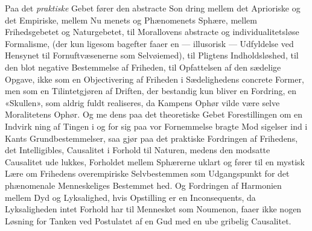\documentclass[12pt,a4paper]{book}
\begin{document}
Paa det \emph{praktiske} Gebet fører den abstracte Son\-%
dring mellem det Aprioriske og det Empiriske, mellem Nu\-%
menets og Phænomenets Sphære, mellem Frihedsgebetet og
Naturgebetet, til Morallovens abstracte og individualitetsløse
Formalisme, (der kun ligesom bagefter faaer en --- illusorisk ---
Udfyldelse ved Hensynet til Fornuftvæsenerne som Selvøiemed),
til Pligtens Indholdsløshed, til den blot negative Bestemmelse
af Friheden, til Opfattelsen af den sædelige Opgave, ikke som
en Objectivering af Friheden i Sædelighedens concrete Former,
men som en Tilintetgjøren af Driften, der bestandig kun bliver
en Fordring, en «Skullen», som aldrig fuldt realiseres, da
Kampens Ophør vilde være selve Moralitetens Ophør. Og me\-%
dens paa det theoretiske Gebet Forestillingen om en Indvirk\-%
ning af Tingen i og for sig paa vor Fornemmelse bragte Mod\-%
sigelser ind i Kants Grundbestemmelser, saa gjør paa det
praktiske Fordringen af Frihedens, det Intelligibles, Causalitet
i Forhold til Naturen, medens den modsatte Causalitet ude\-%
lukkes, Forholdet mellem Sphærerne uklart og fører til en
mystisk Lære om Frihedens overempiriske Selvbestemmen som
Udgangspunkt for det phænomenale Menneskeliges Bestemmet\-%
hed. Og Fordringen af Harmonien mellem Dyd og Lyksalighed,
hvis Opstilling er en Inconsequents, da Lyksaligheden intet
Forhold har til Mennesket som Noumenon, faaer ikke nogen
Løsning for Tanken ved Postulatet af en Gud med en ube\-%
gribelig Causalitet.
\end{document}
